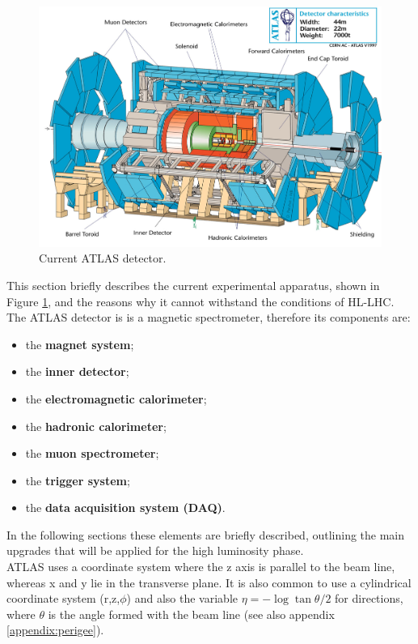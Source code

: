 \documentclass[a4paper,twoside,12pt]{book}
\begin{document}
\begin{figure} [h]
	\includegraphics[width=\textwidth]{atlasdet}
	\caption{Current ATLAS detector.}
	\label{fig:current_atlasdet}
\end{figure}

This section briefly describes the current experimental apparatus, shown in Figure \ref{fig:current_atlasdet}, and the reasons why it cannot withstand the conditions of HL-LHC. \\

The ATLAS detector is is a magnetic spectrometer, therefore its components are:
\begin{itemize}
\item the \textbf{magnet system};
\item the \textbf{inner detector};
\item the \textbf{electromagnetic calorimeter};
\item the \textbf{hadronic calorimeter};
\item the \textbf{muon spectrometer};
\item the \textbf{trigger system};
\item the \textbf{data acquisition system (DAQ)}.
\end{itemize}

In the following sections these elements are briefly described, outlining the main upgrades that will be applied for the high luminosity phase. \\

ATLAS uses a coordinate system where the z axis is parallel to the beam line, whereas x and y lie in the transverse plane. It is also common to use
a cylindrical coordinate system (r,z,$\phi$) and also the variable $\eta = -\log{\tan{\theta/2}}$ for directions, where $\theta$ is the angle formed with 
the beam line (see also appendix \ref{appendix:perigee}).
\end{document}
